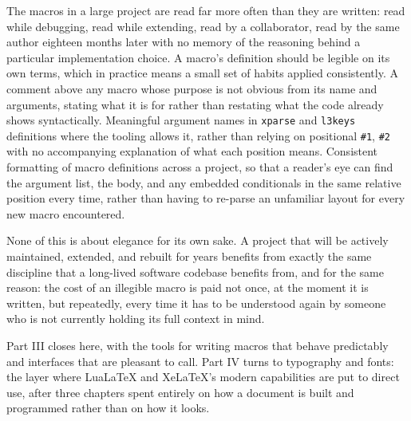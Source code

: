 The macros in a large project are read far more often than they are written: read while debugging, read while extending, read by a collaborator, read by the same author eighteen months later with no memory of the reasoning behind a particular implementation choice. A macro's definition should be legible on its own terms, which in practice means a small set of habits applied consistently. A comment above any macro whose purpose is not obvious from its name and arguments, stating what it is for rather than restating what the code already shows syntactically. Meaningful argument names in \texttt{xparse} and \texttt{l3keys} definitions where the tooling allows it, rather than relying on positional \texttt{\#1}, \texttt{\#2} with no accompanying explanation of what each position means. Consistent formatting of macro definitions across a project, so that a reader's eye can find the argument list, the body, and any embedded conditionals in the same relative position every time, rather than having to re-parse an unfamiliar layout for every new macro encountered.

None of this is about elegance for its own sake. A project that will be actively maintained, extended, and rebuilt for years benefits from exactly the same discipline that a long-lived software codebase benefits from, and for the same reason: the cost of an illegible macro is paid not once, at the moment it is written, but repeatedly, every time it has to be understood again by someone who is not currently holding its full context in mind.

Part III closes here, with the tools for writing macros that behave predictably and interfaces that are pleasant to call. Part IV turns to typography and fonts: the layer where LuaLaTeX and XeLaTeX's modern capabilities are put to direct use, after three chapters spent entirely on how a document is built and programmed rather than on how it looks.

